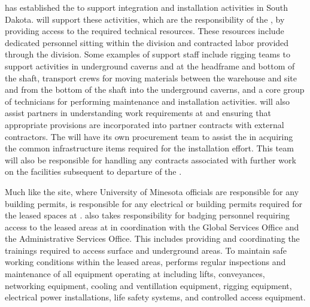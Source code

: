  has established the  to support integration
and installation activities in South Dakota.  will support
these activities, which are the responsibility of the , by
providing access to the required technical resources.  These resources
include dedicated  personnel sitting within the division
and contracted labor provided through the division.  Some examples of
 support staff include rigging teams to support activities 
in underground caverns and at the headframe and bottom of the shaft,
transport crews for moving materials between the warehouse and site 
and from the bottom of the shaft into the underground caverns, and a 
core group of technicians for performing maintenance and installation
activities.   will also assist  partners 
in understanding work requirements at  and ensuring that 
appropriate provisions are incorporated into partner contracts with 
external contractors.  The  will have its own procurement 
team to assist the  in acquiring the common infrastructure 
items required for the installation effort.  This team will also be 
responsible for handling any contracts associated with further work 
on the facilities subsequent to departure of the  .         

Much like the  site, where University of Minesota 
officials are responsible for any building permits,  
is responsible for any electrical or building permits required 
for the leased spaces at .   also takes 
responsibility for badging personnel requiring access to the 
leased areas at  in coordination with the  
Global Services Office and the  Administrative Services 
Office. This includes providing and coordinating the trainings 
required to access surface and underground areas.  To maintain safe 
working conditions within the leased areas,  performs 
regular inspections and maintenance of all  
equipment operating at  including lifts, conveyances, 
networking equipment, cooling and ventillation equipment, rigging 
equipment, electrical power installations, life safety systems, 
and controlled access equipment.
